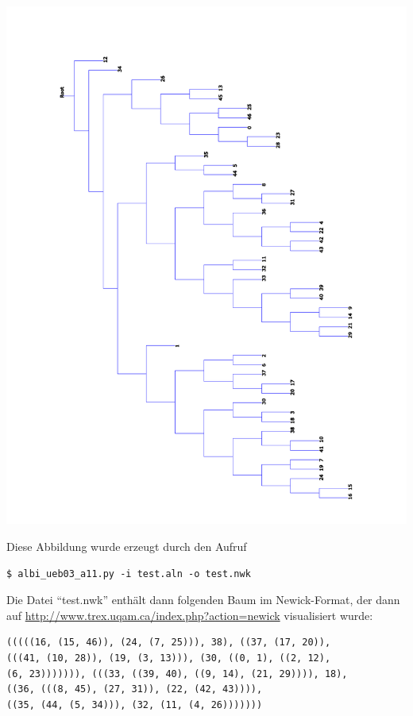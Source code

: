 \documentclass{homework}
\begin{document}
\begin{enumerate}
\begin{enumerate}
\includegraphics[angle=270,width=\linewidth]{u3_aufg3_tree.pdf}

Diese Abbildung wurde erzeugt durch den Aufruf
\begin{verbatim}
$ albi_ueb03_a11.py -i test.aln -o test.nwk
\end{verbatim}

Die Datei "`test.nwk"' enthält dann folgenden Baum im Newick-Format, der dann auf
\url{http://www.trex.uqam.ca/index.php?action=newick} visualisiert wurde:

\begin{verbatim}
(((((16, (15, 46)), (24, (7, 25))), 38), ((37, (17, 20)),
(((41, (10, 28)), (19, (3, 13))), (30, ((0, 1), ((2, 12),
(6, 23))))))), (((33, ((39, 40), ((9, 14), (21, 29)))), 18),
((36, (((8, 45), (27, 31)), (22, (42, 43)))),
((35, (44, (5, 34))), (32, (11, (4, 26)))))))
\end{verbatim}

\end{enumerate}


\end{enumerate}
\end{document}
